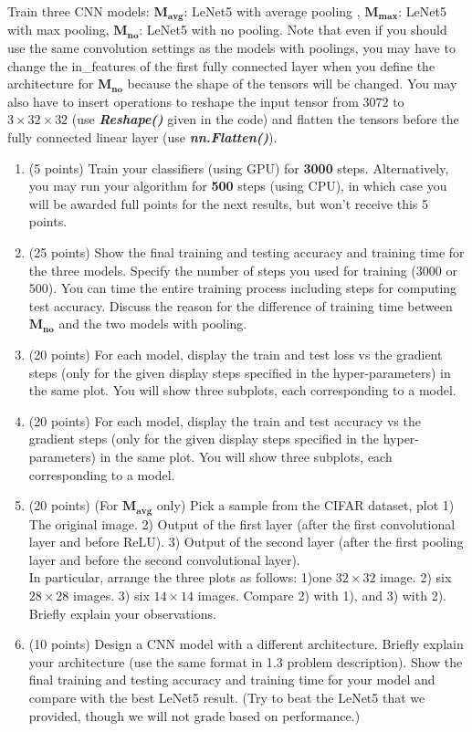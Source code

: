 \documentclass{article}
\begin{document}
Train three CNN models: $\bm{M_{avg}}$: LeNet5 with average pooling , $\bm{M_{max}}$: LeNet5 with max pooling, $\bm{M_{no}}$: LeNet5 with no pooling. Note that even if you should use the same convolution settings as the models with poolings, you may have to change the in\_features of the first fully connected layer when you define the architecture for $\bm{M_{no}}$ because the shape of the tensors will be changed. You may also have to insert operations to reshape the input tensor from $3072$ to $3 \times 32\times 32$ (use \textbf{\textit{Reshape()}} given in the code) and flatten the tensors before the fully connected linear layer (use \textbf{\textit{nn.Flatten()}}). 
\begin{enumerate}[a]

    \item (5 points) Train your classifiers (using GPU) for \textbf{3000} steps. Alternatively, you may run your algorithm for \textbf{500} steps (using CPU), in which case you will be awarded full points for the next results, but won't receive this 5 points. 
    
    
    \item (25 points) Show the final training and testing accuracy and training time for the three models. Specify the number of steps you used for training ($3000$ or $500$). You can time the entire training process including steps for computing test accuracy. Discuss the reason for the difference of training time between $\bm{M_{no}}$ and the two models with pooling.
    
    \item (20 points) For each model, display the train and test loss vs the gradient steps (only for the given display steps specified in the hyper-parameters) in the same plot. You will show three subplots, each corresponding to a model.

    \item (20 points) For each model, display the train and test accuracy vs the gradient steps (only for the given display steps specified in the hyper-parameters) in the same plot. You will show three subplots, each corresponding to a model.
    

    \item (20 points) (For $\bm{M_{avg}}$ only) Pick a sample from the CIFAR dataset, plot 1) The original image. 2) Output of the first layer (after the first convolutional layer and before ReLU). 3) Output of the second layer (after the first pooling layer and before the second convolutional layer). \\
    In particular, arrange the three plots as follows: 1)one $32 \times 32$ image. 2) six $28 \times 28$ images. 3) six $14 \times 14$ images. Compare 2) with 1), and 3) with 2). Briefly explain your observations.
    
    \item (10 points) Design a CNN model with a different architecture. Briefly explain your architecture (use the same format in 1.3 problem description). Show the final training and testing accuracy and training time for your model and compare with the best LeNet5 result. (Try to beat the LeNet5 that we provided, though we will not grade based on performance.)
    
\end{enumerate}
\end{document}
